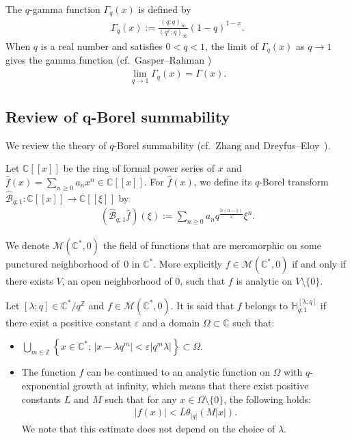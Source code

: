 The $q$-gamma function $\Gamma_q(x)$ is defined by
\begin{gather*}
\Gamma_q(x):=\frac{(q;q)_\infty}{(q^x;q)_\infty}(1-q)^{1-x}.
\end{gather*}
When $q$ is a real number and satisfies $0<q<1$, the limit of $\Gamma_q(x)$ as $q\to1$ gives the gamma function (cf.\ Gasper--Rahman {\cite[Section~1.10]{Gasper&Rahman2004}})
\begin{gather}\label{qgamma_reduction}
\lim_{q\to1}\Gamma_q(x)=\Gamma(x).
\end{gather}

\subsection[Review of $q$-Borel summability]{Review of $\boldsymbol{q}$-Borel summability}\label{Review}
We review the theory of $q$-Borel summability (cf.~Zhang \cite{Zhang2002, Zhang2005} and Dreyfus--Eloy~\cite{DreyfusEloy2016}).

Let $\mathbb{C}[[x]]$ be the ring of formal power series of $x$ and $\hat{f}(x)=\sum\limits_{n\ge0}a_nx^n\in\mathbb{C}[[x]]$. For $\hat{f}(x)$, we define its $q$-Borel transform $\hat{\mathcal{B}}_{q;1}\colon \mathbb{C}[[x]]\to\mathbb{C}[[\xi]]$ by
\begin{gather*}
(\hat{\mathcal{B}}_{q;1}\hat{f})(\xi):=\sum_{n\ge0}a_nq^{\frac{n(n-1)}{2}}\xi^n.
\end{gather*}

We denote $\mathcal{M}(\mathbb{C}^*,0)$ the field of functions that are meromorphic on some punctured neigh\-borhood of~0 in $\mathbb{C}^*$. More explicitly $f\in\mathcal{M}(\mathbb{C}^*,0)$ if and only if there exists $V$, an open neighborhood of 0, such that $f$ is analytic on $V\setminus\{0\}$.

Let $[\lambda;q]\in\mathbb{C}^*/q^\mathbb{Z}$ and $f\in\mathcal{M}(\mathbb{C}^*,0)$. It is said that $f$ belongs to $\mathbb{H}_{q;1}^{[\lambda;q]}$ if there exist a positive constant $\varepsilon$ and a domain $\Omega\subset\mathbb{C}$ such that:
\begin{itemize}\itemsep=0pt
\item $\displaystyle\bigcup_{m\in\mathbb{Z}}\left\{x\in\mathbb{C}^* ;\,\left|x-\lambda q^m\right|<\varepsilon\left|q^m\lambda\right|\right\}\subset\Omega$.
\item The function $f$ can be continued to an analytic function on $\Omega$ with $q$-exponential growth at infinity, which means that there exist positive constants $L$ and $M$ such that for any $x\in\Omega\setminus\{0\}$, the following holds:
\begin{gather*}
|f(x)|<L\theta_{|q|}(M|x|).
\end{gather*}
We note that this estimate does not depend on the choice of $\lambda$.
\end{itemize}

